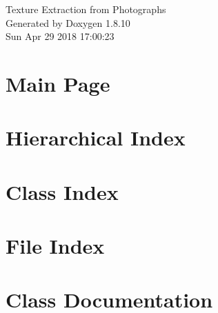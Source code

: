 \documentclass[twoside]{book}
\newcommand{\+}{\discretionary{\mbox{\scriptsize$\hookleftarrow$}}{}{}}
\newcommand{\clearemptydoublepage}{%
  \newpage{\pagestyle{empty}\cleardoublepage}%
}
\begin{document}
\hypersetup{pageanchor=false,
             bookmarks=true,
             bookmarksnumbered=true,
             pdfencoding=unicode
            }
\begin{titlepage}
\vspace*{7cm}
\begin{center}%
{\Large Texture Extraction from Photographs }\\
\vspace*{1cm}
{\large Generated by Doxygen 1.8.10}\\
\vspace*{0.5cm}
{\small Sun Apr 29 2018 17:00:23}\\
\end{center}
\end{titlepage}
\clearemptydoublepage
\tableofcontents
\clearemptydoublepage
{}
\hypersetup{pageanchor=true}

\chapter{Main Page}
\label{index}\hypertarget{index}{}
\chapter{Hierarchical Index}

\chapter{Class Index}

\chapter{File Index}

\chapter{Class Documentation}





























\end{document}
